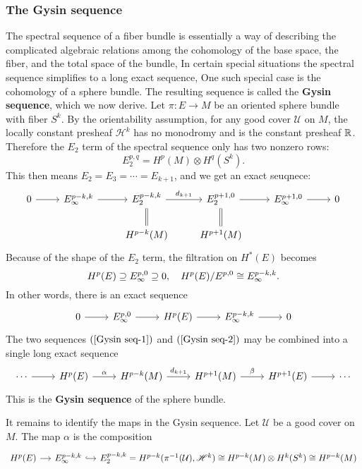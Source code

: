 \subsubsection{The Gysin sequence}
The spectral sequence of a fiber bundle is essentially a way of describing the complicated algebraic relations among the cohomology of the base space, the fiber, and 
the total space of the bundle, In certain special situations the spectral sequence simplifies to a long exact sequence, One such special case is the cohomology of a 
sphere bundle. The resulting sequence is called the \textbf{Gysin sequence}, which we now derive.
Let $\pi:E\to M$ be an oriented sphere bundle with fiber $S^k$. By the orientability assumption, for any good cover $\mathcal{U}$ on $M$, the locally constant presheaf 
$\mathscr{H}^k$ has no monodromy and is the constant presheaf $\mathbb{R}$. Therefore the $E_2$ term of the spectral sequence only has two nonzero rows:
\[E_2^{p,q}=H^p(M)\otimes H^q(S^k).\]
This then means $E_2=E_3=\cdots=E_{k+1}$, and we get an exact seuqnece:
\begin{equation}\label{Gysin seq-1}
\begin{tikzcd}
0\ar[r]&E_{\infty}^{p-k,k}\ar[r]&E_2^{p-k,k}\ar[r,"d_{k+1}"]&E_2^{p+1,0}\ar[r]&E_{\infty}^{p+1,0}\ar[r]&0\\
&&H^{p-k}(M)\ar[u,equal]&H^{p+1}(M)\ar[u,equal]&&
\end{tikzcd}
\end{equation}
Because of the shape of the $E_2$ term, the filtration on $H^*(E)$ becomes
\[H^p(E)\supseteq E^{p,0}_{\infty}\supseteq 0,\quad H^p(E)/E^{p,0}\cong E^{p-k,k}_{\infty}.\]
In other words, there is an exact sequence
\begin{equation}\label{Gysin seq-2}
\begin{tikzcd}
0\ar[r]&E^{p,0}_{\infty}\ar[r]&H^p(E)\ar[r]&E_\infty^{p-k,k}\ar[r]&0
\end{tikzcd}
\end{equation}
The two sequences $(\ref{Gysin seq-1})$ and $(\ref{Gysin seq-2})$ may be combined into a single long exact sequence
\[\begin{tikzcd}
\cdots\ar[r]&H^p(E)\ar[r,"\alpha"]&H^{p-k}(M)\ar[r,"d_{k+1}"]&H^{p+1}(M)\ar[r,"\beta"]&H^{p+1}(E)\ar[r]&\cdots
\end{tikzcd}\]
This is the \textbf{Gysin sequence} of the sphere bundle.\par
It remains to identify the maps in the Gysin sequence. Let $\mathcal{U}$ be a good cover on $M$. The map $\alpha$ is the composition
\[\begin{tikzcd}[column sep=1.2em]
H^p(E)\ar[r]&E_{\infty}^{p-k,k}\ar[r,hook]&E_2^{p-k,k}=H^{p-k}(\pi^{-1}(\mathcal{U}),\mathscr{H}^k)\cong H^{p-k}(M)\otimes H^k(S^k)\cong H^{p-k}(M)
\end{tikzcd}\]
